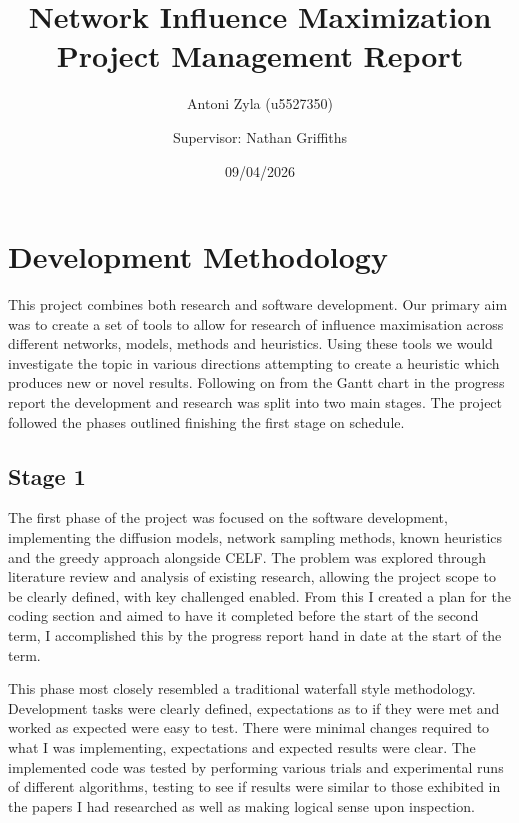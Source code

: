 \documentclass{article}
\title{\textbf{Network Influence Maximization Project Management Report}}
\author{Antoni Zyla (u5527350) \and Supervisor: Nathan Griffiths}
\date{09/04/2026}
\begin{document}
\maketitle
\tableofcontents

\linespread{1.25}

\section{Development Methodology}

This project combines both research and software development.
Our primary aim was to create a set of tools to allow for research of influence maximisation across different networks, models, methods and heuristics.
Using these tools we would investigate the topic in various directions attempting to create a heuristic which produces new or novel results.
Following on from the Gantt chart in the progress report the development and research was split into two main stages. The project followed the phases outlined finishing the first stage on schedule.

\subsection{Stage 1}
The first phase of the project was focused on the software development, implementing the diffusion models, network sampling methods, known heuristics and the greedy approach alongside CELF.
The problem was explored through literature review and analysis of existing research, allowing the project scope to be clearly defined, with key challenged enabled.
From this I created a plan for the coding section and aimed to have it completed before the start of the second term, I accomplished this by the progress report hand in date at the start of the term.

This phase most closely resembled a traditional waterfall style methodology.
Development tasks were clearly defined, expectations as to if they were met and worked as expected were easy to test.
There were minimal changes required to what I was implementing, expectations and expected results were clear.
The implemented code was tested by performing various trials and experimental runs of different algorithms, testing to see if results were similar to those exhibited in the papers I had researched as well as making logical sense upon inspection.
\end{document}
